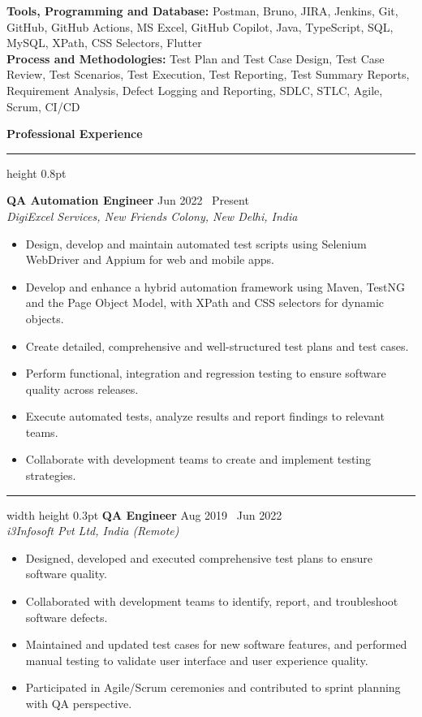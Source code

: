 \documentclass[10pt,a4paper]{article}
\newcommand{\sectionheader}[1]{%
    \vspace{4pt}
    {\normalsize\bfseries #1}
    \vspace{1pt}
    \hrule height 0.8pt
    \vspace{3pt}
}
\newcommand{\jobentry}[3]{%
    \vspace{1pt}
    {\normalsize\bfseries #1} \hfill #2\\
    \textit{#3}
}
\newcommand{\entrysep}{\vspace{3pt}\hrule width \hsize height 0.3pt\vspace{5pt}}
\begin{document}
\textbf{Tools, Programming and Database:} Postman, Bruno, JIRA, Jenkins, Git, GitHub, GitHub Actions, MS Excel, GitHub Copilot, Java, TypeScript, SQL, MySQL, XPath, CSS Selectors, Flutter\\[1pt]

\textbf{Process and Methodologies:} Test Plan and Test Case Design, Test Case Review, Test Scenarios, Test Execution, Test Reporting, Test Summary Reports, Requirement Analysis, Defect Logging and Reporting, SDLC, STLC, Agile, Scrum, CI/CD


\sectionheader{Professional Experience}

\jobentry{QA Automation Engineer}{Jun 2022 \textendash\ Present}{DigiExcel Services, New Friends Colony, New Delhi, India}

\begin{itemize}
    \item Design, develop and maintain automated test scripts using Selenium WebDriver and Appium for web and mobile apps.
    \item Develop and enhance a hybrid automation framework using Maven, TestNG and the Page Object Model, with XPath and CSS selectors for dynamic objects.
    \item Create detailed, comprehensive and well-structured test plans and test cases.
    \item Perform functional, integration and regression testing to ensure software quality across releases.
    \item Execute automated tests, analyze results and report findings to relevant teams.
    \item Collaborate with development teams to create and implement testing strategies.
\end{itemize}

\entrysep
\jobentry{QA Engineer}{Aug 2019 \textendash\ Jun 2022}{i3Infosoft Pvt Ltd, India (Remote)}

\begin{itemize}
    \item Designed, developed and executed comprehensive test plans to ensure software quality.
    \item Collaborated with development teams to identify, report, and troubleshoot software defects.
    \item Maintained and updated test cases for new software features, and performed manual testing to validate user interface and user experience quality.
    \item Participated in Agile/Scrum ceremonies and contributed to sprint planning with QA perspective.
\end{itemize}
\end{document}
